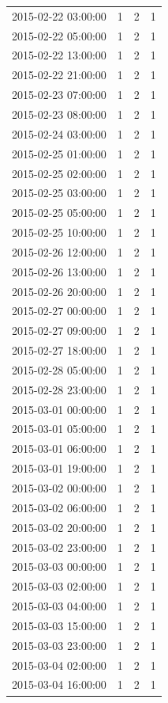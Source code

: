 \begin{tabular}{lrrr}
2015-02-22 03:00:00 & 1 & 2 & 1 \\
2015-02-22 05:00:00 & 1 & 2 & 1 \\
2015-02-22 13:00:00 & 1 & 2 & 1 \\
2015-02-22 21:00:00 & 1 & 2 & 1 \\
2015-02-23 07:00:00 & 1 & 2 & 1 \\
2015-02-23 08:00:00 & 1 & 2 & 1 \\
2015-02-24 03:00:00 & 1 & 2 & 1 \\
2015-02-25 01:00:00 & 1 & 2 & 1 \\
2015-02-25 02:00:00 & 1 & 2 & 1 \\
2015-02-25 03:00:00 & 1 & 2 & 1 \\
2015-02-25 05:00:00 & 1 & 2 & 1 \\
2015-02-25 10:00:00 & 1 & 2 & 1 \\
2015-02-26 12:00:00 & 1 & 2 & 1 \\
2015-02-26 13:00:00 & 1 & 2 & 1 \\
2015-02-26 20:00:00 & 1 & 2 & 1 \\
2015-02-27 00:00:00 & 1 & 2 & 1 \\
2015-02-27 09:00:00 & 1 & 2 & 1 \\
2015-02-27 18:00:00 & 1 & 2 & 1 \\
2015-02-28 05:00:00 & 1 & 2 & 1 \\
2015-02-28 23:00:00 & 1 & 2 & 1 \\
2015-03-01 00:00:00 & 1 & 2 & 1 \\
2015-03-01 05:00:00 & 1 & 2 & 1 \\
2015-03-01 06:00:00 & 1 & 2 & 1 \\
2015-03-01 19:00:00 & 1 & 2 & 1 \\
2015-03-02 00:00:00 & 1 & 2 & 1 \\
2015-03-02 06:00:00 & 1 & 2 & 1 \\
2015-03-02 20:00:00 & 1 & 2 & 1 \\
2015-03-02 23:00:00 & 1 & 2 & 1 \\
2015-03-03 00:00:00 & 1 & 2 & 1 \\
2015-03-03 02:00:00 & 1 & 2 & 1 \\
2015-03-03 04:00:00 & 1 & 2 & 1 \\
2015-03-03 15:00:00 & 1 & 2 & 1 \\
2015-03-03 23:00:00 & 1 & 2 & 1 \\
2015-03-04 02:00:00 & 1 & 2 & 1 \\
2015-03-04 16:00:00 & 1 & 2 & 1 \\

\end{tabular}
